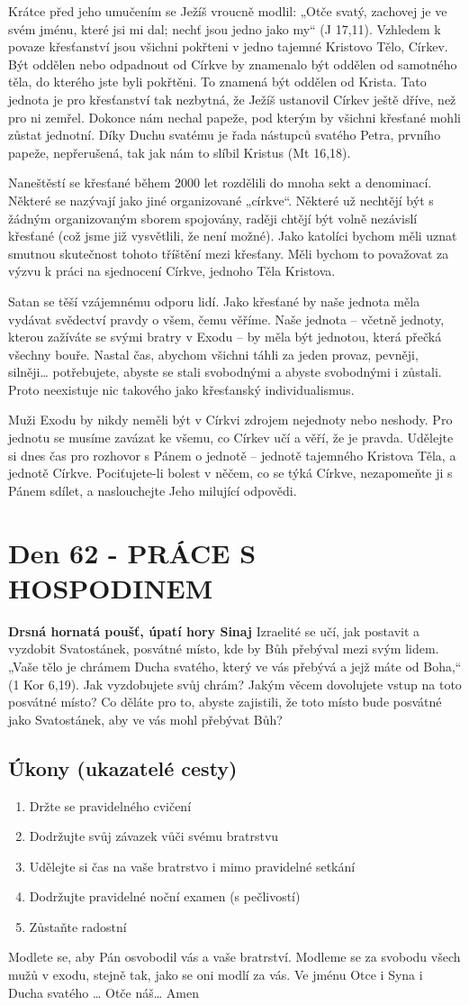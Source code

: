 \documentclass[11pt]{article}
\newcommand{\zacatekDevatyTyden}{
\textbf{Drsná hornatá poušť, úpatí hory Sinaj} \newline 
Izraelité se učí, jak postavit a vyzdobit Svatostánek, posvátné místo, kde by Bůh přebýval mezi svým lidem. „Vaše tělo je chrámem Ducha svatého, který ve vás přebývá a jejž máte od Boha,“ (1 Kor 6,19). Jak vyzdobujete svůj chrám? Jakým věcem dovolujete vstup na toto posvátné místo? Co děláte pro to, abyste zajistili, že toto místo bude posvátné jako Svatostánek, aby ve vás mohl přebývat Bůh?

\subsection*{Úkony (ukazatelé cesty)}
\begin{enumerate}
  \item Držte se pravidelného cvičení
  \item Dodržujte svůj závazek vůči svému bratrstvu
  \item Udělejte si čas na vaše bratrstvo i mimo pravidelné setkání
  \item Dodržujte pravidelné noční examen (s pečlivostí)
  \item Zůstaňte radostní
\end{enumerate}
Modlete se, aby Pán osvobodil vás a vaše bratrství. \newline
Modleme se za svobodu všech mužů v exodu, stejně tak, jako se oni modlí za vás.\newline
Ve jménu Otce i Syna i Ducha svatého …  Otče náš… Amen
}
\begin{document}
Krátce před jeho umučením se Ježíš vroucně modlil: „Otče svatý, zachovej je ve svém jménu, které jsi mi
dal; nechť jsou jedno jako my“ (J 17,11). Vzhledem k povaze křesťanství jsou všichni pokřteni v jedno
tajemné Kristovo Tělo, Církev. Být oddělen nebo odpadnout od Církve by znamenalo být oddělen od
samotného těla, do kterého jste byli pokřtěni. To znamená být oddělen od Krista. Tato jednota je pro
křesťanství tak nezbytná, že Ježíš ustanovil Církev ještě dříve, než pro ni zemřel. Dokonce nám nechal
papeže, pod kterým by všichni křesťané mohli zůstat jednotní. Díky Duchu svatému je řada nástupců svatého
Petra, prvního papeže, nepřerušená, tak jak nám to slíbil Kristus (Mt 16,18).

Naneštěstí se křesťané během 2000 let rozdělili do mnoha sekt a denominací. Některé se nazývají jako jiné
organizované „církve“. Některé už nechtějí být s žádným organizovaným sborem spojovány, raději chtějí být
volně nezávislí křesťané (což jsme již vysvětlili, že není možné). Jako katolíci bychom měli uznat smutnou
skutečnost tohoto tříštění mezi křesťany. Měli bychom to považovat za výzvu k práci na sjednocení Církve,
jednoho Těla Kristova.

Satan se těší vzájemnému odporu lidí. Jako křesťané by naše jednota měla vydávat svědectví pravdy o všem,
čemu věříme. Naše jednota – včetně jednoty, kterou zažíváte se svými bratry v Exodu – by měla být
jednotou, která přečká všechny bouře. Nastal čas, abychom všichni táhli za jeden provaz, pevněji, silněji…
potřebujete, abyste se stali svobodnými a abyste svobodnými i zůstali. Proto neexistuje nic takového jako
křesťanský individualismus.

Muži Exodu by nikdy neměli být v Církvi zdrojem nejednoty nebo neshody. Pro jednotu se musíme zavázat
ke všemu, co Církev učí a věří, že je pravda. Udělejte si dnes čas pro rozhovor s Pánem o jednotě – jednotě
tajemného Kristova Těla, a jednotě Církve. Pociťujete-li bolest v něčem, co se týká Církve, nezapomeňte ji
s Pánem sdílet, a naslouchejte Jeho milující odpovědi.


\newpage
\section{Den 62 - PRÁCE S HOSPODINEM }
\zacatekDevatyTyden
\end{document}
